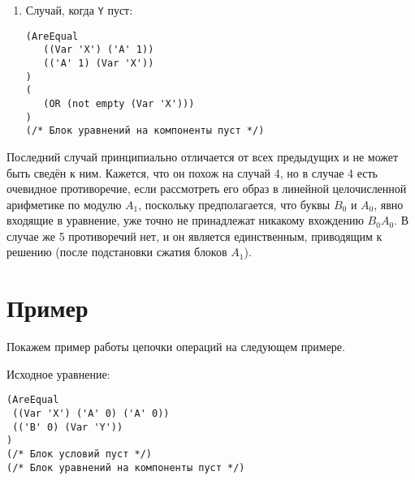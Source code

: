 \documentclass[12pt]{article}
\begin{document}
\begin{enumerate}
\item Случай, когда \verb|Y| пуст:

\begin{verbatim}
(AreEqual 
   ((Var 'X') ('A' 1))
   (('A' 1) (Var 'X'))
)
(
   (OR (not empty (Var 'X')))
)
(/* Блок уравнений на компоненты пуст */)
\end{verbatim}
\end{enumerate}

Последний случай принципиально отличается от всех предыдущих и не может быть сведён к ним. Кажется, что он похож на случай 4, но в случае 4 есть очевидное противоречие, если рассмотреть его образ в линейной целочисленной арифметике по модулю $A_1$, поскольку предполагается, что буквы $B_0$ и $A_0$, явно входящие в уравнение, уже точно не принадлежат никакому вхождению $B_0 A_0$. В случае же 5 противоречий нет, и он является единственным, приводящим к решению (после подстановки сжатия блоков $A_1$). 
 
\section{Пример}

Покажем пример работы цепочки операций на следующем примере.

Исходное уравнение: 

\begin{verbatim}
(AreEqual 
 ((Var 'X') ('A' 0) ('A' 0)) 
 (('B' 0) (Var 'Y'))
)
(/* Блок условий пуст */)
(/* Блок уравнений на компоненты пуст */)
\end{verbatim}
\end{document}
